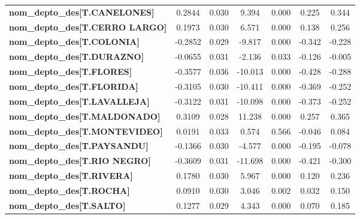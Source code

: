 \begin{center}
\begin{tabular}{lcccccc}
\textbf{nom\_depto\_des[T.CANELONES]}      &       0.2844  &        0.030     &     9.394  &         0.000        &        0.225    &        0.344     \\
\textbf{nom\_depto\_des[T.CERRO LARGO]}    &       0.1973  &        0.030     &     6.571  &         0.000        &        0.138    &        0.256     \\
\textbf{nom\_depto\_des[T.COLONIA]}        &      -0.2852  &        0.029     &    -9.817  &         0.000        &       -0.342    &       -0.228     \\
\textbf{nom\_depto\_des[T.DURAZNO]}        &      -0.0655  &        0.031     &    -2.136  &         0.033        &       -0.126    &       -0.005     \\
\textbf{nom\_depto\_des[T.FLORES]}         &      -0.3577  &        0.036     &   -10.013  &         0.000        &       -0.428    &       -0.288     \\
\textbf{nom\_depto\_des[T.FLORIDA]}        &      -0.3105  &        0.030     &   -10.411  &         0.000        &       -0.369    &       -0.252     \\
\textbf{nom\_depto\_des[T.LAVALLEJA]}      &      -0.3122  &        0.031     &   -10.098  &         0.000        &       -0.373    &       -0.252     \\
\textbf{nom\_depto\_des[T.MALDONADO]}      &       0.3109  &        0.028     &    11.238  &         0.000        &        0.257    &        0.365     \\
\textbf{nom\_depto\_des[T.MONTEVIDEO]}     &       0.0191  &        0.033     &     0.574  &         0.566        &       -0.046    &        0.084     \\
\textbf{nom\_depto\_des[T.PAYSANDU]}       &      -0.1366  &        0.030     &    -4.577  &         0.000        &       -0.195    &       -0.078     \\
\textbf{nom\_depto\_des[T.RIO NEGRO]}      &      -0.3609  &        0.031     &   -11.698  &         0.000        &       -0.421    &       -0.300     \\
\textbf{nom\_depto\_des[T.RIVERA]}         &       0.1780  &        0.030     &     5.967  &         0.000        &        0.120    &        0.236     \\
\textbf{nom\_depto\_des[T.ROCHA]}          &       0.0910  &        0.030     &     3.046  &         0.002        &        0.032    &        0.150     \\
\textbf{nom\_depto\_des[T.SALTO]}          &       0.1277  &        0.029     &     4.343  &         0.000        &        0.070    &        0.185     \\

\end{tabular}
\end{center}
